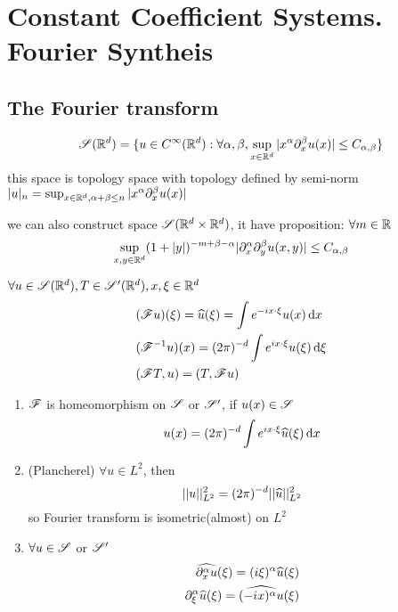\documentclass[../main]{subfiles}
\begin{document}
\section{Constant Coefficient Systems. Fourier Syntheis}

\subsection{The Fourier transform}

\begin{defn}
    \begin{equation}
        \mathscr{S}(\mathbb{R}^d)=\{u\in C^\infty(\mathbb{R}^d): \forall \alpha,\beta,\sup_{x\in \mathbb{R}^d}|x^\alpha \partial_x^\beta u(x)|\le C_{\alpha,\beta}\}
    \end{equation}
    this space is topology space with topology defined by semi-norm $|u|_n=\sup_{x \in \mathbb{R}^d,\alpha+\beta\le n}|x^\alpha \partial_x^\beta u(x)|$ 
\end{defn}
\begin{rem}
    we can also construct space $\mathscr{S}(\mathbb{R}^d\times \mathbb{R}^d)$, it have proposition: $\forall m\in \mathbb{R}$\begin{equation}
        \sup_{x,y\in \mathbb{R}^d}(1+|y|)^{-m+\beta-\alpha}|\partial_x^\alpha \partial_y^\beta u(x,y)|\le C_{\alpha,\beta} 
    \end{equation}
\end{rem}

\begin{defn}
    $\forall u\in \mathscr{S}(\mathbb{R}^d), T \in \mathscr{S}'(\mathbb{R}^d), x,\xi \in \mathbb{R}^d$
    \begin{align}
         & (\mathscr{F} u)(\xi)=\widehat{u}(\xi)=\int e^{-ix\cdot \xi}u(x)\,\mathrm{d}x\\
         & (\mathscr{F}^{-1}u)(x)=(2\pi)^{-d}\int e^{ix\cdot \xi}u(\xi)\,\mathrm{d}\xi\\
         & (\mathscr{F} T,u)=(T,\mathscr{F} u)
    \end{align}
\end{defn}

\begin{thm}
    \begin{enumerate}
        \item $\mathscr{F}$ is homeomorphism on $\mathscr{S}$ or $\mathscr{S}'$, if $u(x)\in \mathscr{S}$ $$\displaystyle u(x)=(2\pi)^{-d}\int e^{ix\cdot \xi}\widehat{u}(\xi)\,\mathrm{d}x$$
        \item (Plancherel\cite{tempered}) $\forall u \in L^2$, then\begin{equation}
            ||u||_{L^2}^2=(2\pi)^{-d}||\widehat u||_{L^2}^2
        \end{equation}
        so Fourier transform is isometric(almost) on $L^2$
        \item $\forall u\in \mathscr{S} $ or $\mathscr{S}'$\begin{align}
            \widehat{\partial_x^\alpha u}(\xi)=(i\xi)^\alpha\widehat{u}(\xi)\\
            \partial_\xi^\alpha\widehat{u}(\xi)=\widehat{(-ix)^\alpha u}(\xi)
        \end{align}
    \end{enumerate}
\end{thm}
\end{document}
